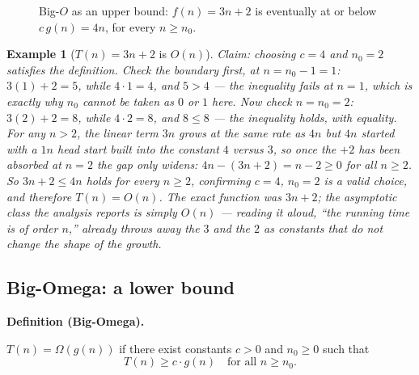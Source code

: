 \documentclass[11pt]{article}
\newtheorem{example}{Example}[section]
\newenvironment{definitionbox}[1]{%
  \par\noindent\textbf{Definition (#1).}\ \itshape
}{\par\vspace{0.3em}}
\begin{document}
\begin{figure}[h]
  \centering
  \caption{Big-$O$ as an upper bound: $f(n)=3n+2$ is eventually at or below
  $c\,g(n)=4n$, for every $n \ge n_0$.}
  \label{fig:bigo}
\end{figure}

\begin{example}[$T(n) = 3n + 2$ is $O(n)$]
Claim: choosing $c = 4$ and $n_0 = 2$ satisfies the definition. Check the
boundary first, at $n = n_0 - 1 = 1$: $3(1) + 2 = 5$, while $4 \cdot 1 = 4$,
and $5 > 4$ --- the inequality \emph{fails} at $n = 1$, which is exactly why
$n_0$ cannot be taken as $0$ or $1$ here. Now check $n = n_0 = 2$:
$3(2) + 2 = 8$, while $4 \cdot 2 = 8$, and $8 \leq 8$ --- the inequality
holds, with equality. For any $n > 2$, the linear term $3n$ grows at the
same rate as $4n$ but $4n$ started with a $1n$ head start built into the
constant $4$ versus $3$, so once the $+2$ has been absorbed at $n=2$ the gap
only widens: $4n - (3n+2) = n - 2 \geq 0$ for all $n \geq 2$. So $3n + 2 \leq
4n$ holds for every $n \geq 2$, confirming $c = 4$, $n_0 = 2$ is a valid
choice, and therefore $T(n) = O(n)$. The exact function was $3n + 2$; the
asymptotic class the analysis reports is simply $O(n)$ --- reading it aloud,
``the running time is of order $n$,'' already throws away the $3$ and the
$2$ as constants that do not change the shape of the growth.
\end{example}

\subsection{Big-Omega: a lower bound}

\begin{definitionbox}{Big-Omega}
$T(n) = \Omega(g(n))$ if there exist constants $c > 0$ and $n_0 \geq 0$ such
that
\[
  T(n) \geq c \cdot g(n) \quad \text{for all } n \geq n_0.
\]
\end{definitionbox}
\end{document}
